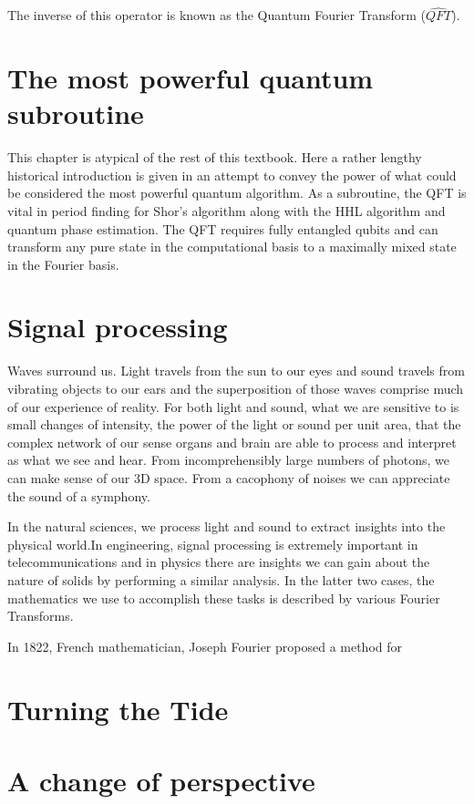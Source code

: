 \documentclass{book}
\begin{document}
The inverse of this operator is known as the Quantum Fourier Transform ($\hat{QFT}$).  

\section{The most powerful quantum subroutine}

This chapter is atypical of the rest of this textbook. Here a rather lengthy historical introduction is given in an attempt to convey the power of what could be considered the most powerful quantum algorithm. As a subroutine, the QFT is vital in period finding for Shor's algorithm along with the HHL algorithm and quantum phase estimation. The QFT requires fully entangled qubits and can transform any pure state in the computational basis to a maximally mixed state in the Fourier basis. 

\section{Signal processing}

Waves surround us. Light travels from the sun to our eyes and sound travels from vibrating objects to our ears and the superposition of those waves comprise much of our experience of reality. For both light and sound, what we are sensitive to is small changes of intensity, the power of the light or sound per unit area, that the complex network of our sense organs and brain are able to process and interpret as what we see and hear. From incomprehensibly large numbers of photons, we can make sense of our 3D space. From a cacophony of noises we can appreciate the sound of a symphony. 

In the natural sciences, we process light and sound to extract insights into the physical world.In engineering, signal processing is extremely important in telecommunications and in physics there are insights we can gain about the nature of solids by performing a similar analysis. In the latter two cases, the mathematics we use to accomplish these tasks is described by various Fourier Transforms. 

In 1822, French mathematician, Joseph Fourier proposed a method for 

\section{Turning the Tide}
\section{A change of perspective }
\end{document}
